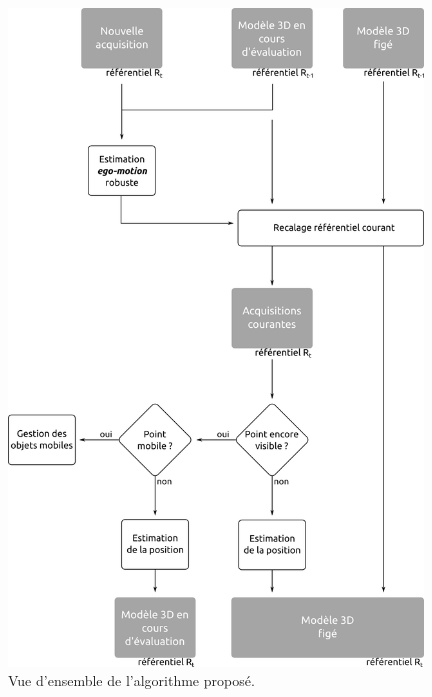 \begin{figure}[h] 
	\centering
	\includegraphics[width=0.98\textwidth]{Chapter4/graphics/detailled_scheme.png}
	\caption{Vue d'ensemble de l'algorithme proposé.}
	\label{fig:ch4_vue_ensemble_algo}
\end{figure}

